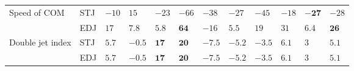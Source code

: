 \begin{tabular}{l}
Speed of COM & STJ & ${-10}$ & ${15}$ & ${-23}$ & ${-66}$ & ${-38}$ & ${-27}$ & ${-45}$ & ${-18}$ & $\mathbf{-27}$ & ${-28}$ \\
 & EDJ & ${17}$ & ${7.8}$ & ${5.8}$ & $\mathbf{64}$ & ${-16}$ & ${5.5}$ & ${19}$ & ${31}$ & ${6.4}$ & $\mathbf{26}$ \\
Double jet index & STJ & ${5.7}$ & ${-0.5}$ & $\mathbf{17}$ & $\mathbf{20}$ & ${-7.5}$ & ${-5.2}$ & ${-3.5}$ & ${6.1}$ & ${3}$ & ${5.1}$ \\
 & EDJ & ${5.7}$ & ${-0.5}$ & $\mathbf{17}$ & $\mathbf{20}$ & ${-7.5}$ & ${-5.2}$ & ${-3.5}$ & ${6.1}$ & ${3}$ & ${5.1}$ \\
\bottomrule
\end{tabular}
